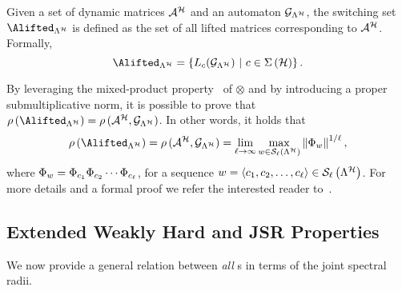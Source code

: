 %
\begin{definition}%
    \label{def:switching_set}%
    Given a set of dynamic matrices $\mathcal{A}^{\mathcal{H}}$ and an automaton $\mathcal{G}_{\Lambda^{\mathcal{H}}}$, the switching set $\Alifted_{\Lambda^\strat}$ is defined as the set of all lifted matrices corresponding to $\mathcal{A}^{\mathcal{H}}$.
    Formally,
    \begin{equation*}
        \Alifted_{\Lambda^\strat} = \left\{ L_{c} ( \GG{\Lambda^\strat} ) \,\, | \,\, c \in \Sigma\left(\strat\right) \right\}.
    \end{equation*}
\end{definition}
%
By leveraging the mixed-product property~\cite{horn2012matrix} of $\otimes$ and by introducing a proper submultiplicative norm, it is possible to prove that $\rho\left(\Alifted_{\Lambda^\strat}\right)= \rho\,(\Aa^{\strat},\GG{\Lambda^\strat})$.
In other words, it holds that
%
\begin{equation*}%
    \rho\left(\Alifted_{\Lambda^\strat}\right)= \rho\,(\Aa^{\strat},\GG{\Lambda^\strat}) = \lim_{\ell\rightarrow \infty} \max_{w \in \sset{\ell}{\Lambda^\strat}}\norm{\clmat{}_{w}}^{1/\ell},
\end{equation*}
%
where $\Phi{}_{w} = \Phi{}_{c_1}\Phi{}_{c_2}\cdots\Phi{}_{c_\ell}$, for a sequence $w = \left\langle c_1, c_2, \ldots, c_\ell\right\rangle \in \mathcal{S}_{\ell}\left( \Lambda^{\mathcal{H}} \right)$.
For more details and a formal proof we refer the interested reader to~\cite{xu2020approximation}.


\subsection{Extended Weakly Hard and JSR Properties}
\label{sec:analytic_results}
%
We now provide a general relation between \emph{all} \ewhc{}s in terms of the joint spectral radii.


